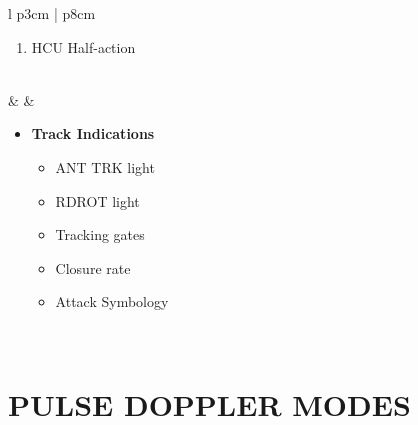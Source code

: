 \documentclass[10pt,usenames,dvipsnames,twoside]{report}
\begin{document}
\begin{center}
\begin{longtable}{l p{3cm} | p{8cm}}
\begin{minipage}[t]{\linewidth}
\begin{itemize}
					\begin{enumerate}[label=(\alph*), resume]
						\item HCU Half-action
					\end{enumerate}
				\end{itemize}
			\end{minipage} \\
			\midrule
			\textbullet &  &
			\begin{minipage}[t]{\linewidth}
				\vspace{-7pt}
				\begin{itemize}
					\item \textbf{Track Indications}
					\begin{itemize}
						\item ANT TRK light
						\item RDROT light
						\item Tracking gates
						\item Closure rate
						\item Attack Symbology
					\end{itemize}
				\end{itemize}
			\end{minipage} \\
			\bottomrule
		\end{longtable}
	\end{center}

	\clearpage

	\section{PULSE DOPPLER MODES}
\end{document}
